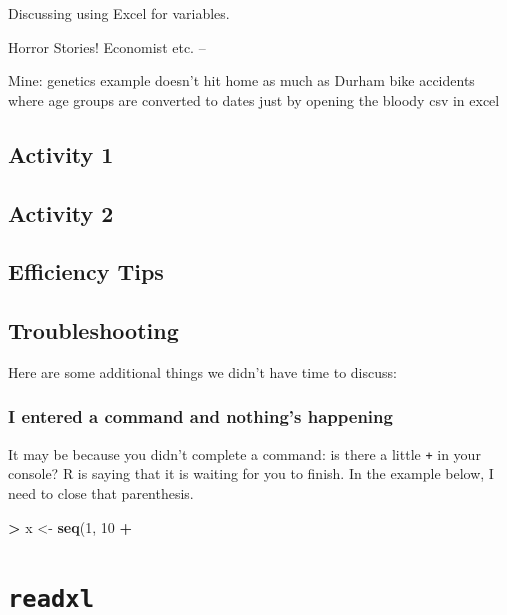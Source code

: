 \documentclass[]{book}
\newenvironment{Shaded}{\begin{snugshade}}{\end{snugshade}}
\newcommand{\DecValTok}[1]{\textcolor[rgb]{0.00,0.00,0.81}{#1}}
\newcommand{\KeywordTok}[1]{\textcolor[rgb]{0.13,0.29,0.53}{\textbf{#1}}}
\newcommand{\NormalTok}[1]{#1}
\newcommand{\OperatorTok}[1]{\textcolor[rgb]{0.81,0.36,0.00}{\textbf{#1}}}
\newcommand{\StringTok}[1]{\textcolor[rgb]{0.31,0.60,0.02}{#1}}
\begin{document}
Discussing using Excel for variables.

Horror Stories! Economist etc. --

Mine: genetics example doesn't hit home as much as Durham bike accidents where age groups are converted to dates just by opening the bloody csv in excel

\hypertarget{activity-1}{%
\section{Activity 1}\label{activity-1}}

\hypertarget{activity-2}{%
\section{Activity 2}\label{activity-2}}

\hypertarget{efficiency-tips}{%
\section{Efficiency Tips}\label{efficiency-tips}}

\hypertarget{troubleshooting}{%
\section{Troubleshooting}\label{troubleshooting}}

Here are some additional things we didn't have time to discuss:

\hypertarget{i-entered-a-command-and-nothings-happening}{%
\subsection{I entered a command and nothing's happening}\label{i-entered-a-command-and-nothings-happening}}

It may be because you didn't complete a command: is there a little \texttt{+} in your console? R is saying that it is waiting for you to finish. In the example below, I need to close that parenthesis.

\begin{Shaded}
\begin{Highlighting}[]
\OperatorTok{>}\StringTok{ }\NormalTok{x <-}\StringTok{ }\KeywordTok{seq}\NormalTok{(}\DecValTok{1}\NormalTok{, }\DecValTok{10}
\OperatorTok{+}\StringTok{ }
\end{Highlighting}
\end{Shaded}

\hypertarget{readxl}{%
\chapter{\texorpdfstring{\texttt{readxl}}{readxl}}\label{readxl}}
\end{document}
